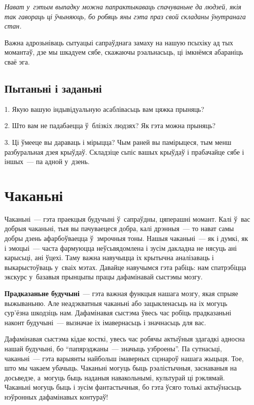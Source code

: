 \emph{Нават у~гэтым выпадку можна папрактыкаваць спачуваньне да людзей, якія так гавораць ці ўчыняюць, бо робяць яны гэта праз свой складаны ўнутранага стан.}

Важна адрозьніваць сытуацыі сапраўднага замаху на нашую псыхіку ад тых момантаў, дзе мы шкадуем сябе, скажаючы рэальнасьць, ці імкнёмся абараніць сваё эга.

\subsection*{Пытаньні і заданьні}

1. Якую вашую індывідуальную асаблівасьць вам цяжка прыняць?

2. Што вам не падабаецца ў~блізкіх людзях? Як гэта можна прыняць?

3. Ці ўмееце вы дараваць і мірыцца? Чым раней вы памірыцеся, тым менш разбуральная дзея крыўдаў. Складзіце сьпіс вашых крыўдаў і прабачайце сябе і іншых~--- па адной у~дзень.


\section{Чаканьні}

Чаканьні~--- гэта праекцыя будучыні ў~сапраўдны, цяперашні момант. Калі ў~вас добрыя чаканьні, тыя вы пачуваецеся добра, калі дрэнныя~--- то нават самы добры дзень афарбоўваецца ў~змрочныя тоны. Нашыя чаканьні~--- як і думкі, як і эмоцыі~--- часта фармуюцца неўсьвядомлена і зусім дакладна не нясуць ані карысьці, ані ўцехі. Таму важна навучыцца іх крытычна аналізаваць і выкарыстоўваць у~сваіх мэтах. Давайце навучымся гэта рабіць: нам спатрэбіцца экскурс у~базавыя прынцыпы працы дафамінавай сыстэмы мозгу.

\textbf{Прадказаньне будучыні}~--- гэта важная функцыя нашага мозгу, якая спрыяе выжываньню. Але неадэкватныя чаканьні або зацыкленасьць на іх могуць сур'ёзна шкодзіць нам. Дафамінавая сыстэма ўвесь час робіць прадказаньні наконт будучыні~--- вызначае іх імавернасьць і значнасьць для вас.


Дафамінавая сыстэма кідае косткі, увесь час робячы актыўныя здагадкі адносна нашай будучыні, бо ``папярэджаны~--- значыць узброены''. Па сутнасьці, чаканьні~--- гэта варыянты найбольш імаверных сцэнароў нашага жыцьця. Тое, што мы чакаем убачыць. Чаканьні могуць быць рэалістычныя, заснаваныя на досьведзе, а~могуць быць наданыя навакольнымі, культурай ці рэклямай. Чаканьні могуць быць і зусім фантастычныя, бо гэта ўсяго толькі актыўнасьць нэўронных дафамінавых контураў!

